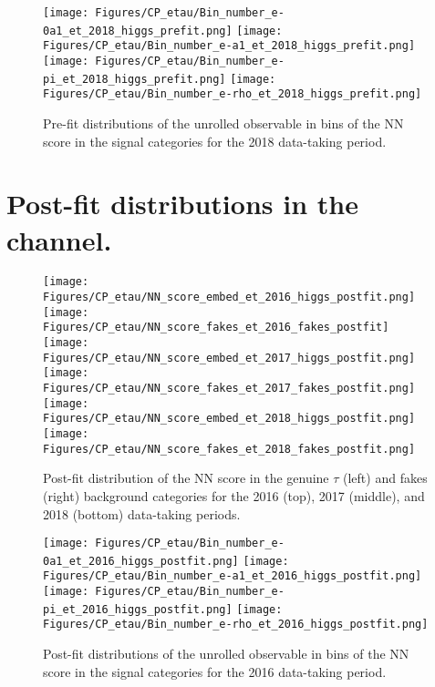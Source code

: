 \begin{figure}[H]
    \centering
    \texttt{[image: Figures/CP\_etau/Bin\_number\_e-0a1\_et\_2018\_higgs\_prefit.png]}
    \texttt{[image: Figures/CP\_etau/Bin\_number\_e-a1\_et\_2018\_higgs\_prefit.png]}
    \texttt{[image: Figures/CP\_etau/Bin\_number\_e-pi\_et\_2018\_higgs\_prefit.png]}
    \texttt{[image: Figures/CP\_etau/Bin\_number\_e-rho\_et\_2018\_higgs\_prefit.png]}
    \caption{Pre-fit distributions of the unrolled \phicp observable in bins of the NN score in the signal categories for the 2018 data-taking period.}
\end{figure}

\newpage
\section{Post-fit distributions in the \et channel.}\label{app:post-fit}

\begin{figure}[H]
    \centering
    \texttt{[image: Figures/CP\_etau/NN\_score\_embed\_et\_2016\_higgs\_postfit.png]}
    \texttt{[image: Figures/CP\_etau/NN\_score\_fakes\_et\_2016\_fakes\_postfit]}
    \texttt{[image: Figures/CP\_etau/NN\_score\_embed\_et\_2017\_higgs\_postfit.png]}
    \texttt{[image: Figures/CP\_etau/NN\_score\_fakes\_et\_2017\_fakes\_postfit.png]}
    \texttt{[image: Figures/CP\_etau/NN\_score\_embed\_et\_2018\_higgs\_postfit.png]}
    \texttt{[image: Figures/CP\_etau/NN\_score\_fakes\_et\_2018\_fakes\_postfit.png]}
    \caption{Post-fit distribution of the NN score in the genuine $\tau$ (left) and fakes (right) background categories for the 2016 (top), 2017 (middle), and 2018 (bottom) data-taking periods.}
\end{figure}

\begin{figure}[H]
    \centering
    \texttt{[image: Figures/CP\_etau/Bin\_number\_e-0a1\_et\_2016\_higgs\_postfit.png]}
    \texttt{[image: Figures/CP\_etau/Bin\_number\_e-a1\_et\_2016\_higgs\_postfit.png]}
    \texttt{[image: Figures/CP\_etau/Bin\_number\_e-pi\_et\_2016\_higgs\_postfit.png]}
    \texttt{[image: Figures/CP\_etau/Bin\_number\_e-rho\_et\_2016\_higgs\_postfit.png]}
    \caption{Post-fit distributions of the unrolled \phicp observable in bins of the NN score in the signal categories for the 2016 data-taking period.}
\end{figure}

